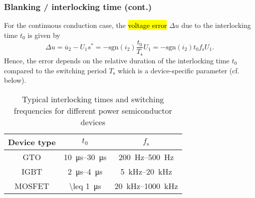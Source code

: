 \begin{frame}
    \frametitle{Blanking / interlocking time (cont.)} 
        For the continuous conduction case, the \hl{voltage error} $\Delta u$ due to the interlocking time $t_0$ is given by
        \begin{equation}
            \Delta u =\overline{u}_2 - U_1s^* = -\mathrm{sgn}(i_2)\frac{t_0}{T_\mathrm{s}}  U_1= -\mathrm{sgn}(i_2)t_0 f_\mathrm{s} U_1.
        \end{equation}
        Hence, the error depends on the relative duration of the interlocking time $t_0$ compared to the switching period $T_\mathrm{s}$ which is a device-specific parameter (cf. below). 

        \begin{table}
            \begin{tabular}{c c c}
                \toprule
                Device type & $t_0$ & $f_\mathrm{s}$ \\
                \midrule
                GTO & \SIrange{10}{30}{\micro\second} & \SIrange{200}{500}{\hertz} \\
                IGBT & \SIrange{2}{4}{\micro\second} & \SIrange{5}{20}{\kilo\hertz} \\
                MOSFET & \SI{\leq 1}{\micro\second} & \SIrange{20}{1000}{\kilo\hertz} \\
                \bottomrule
            \end{tabular}
            \caption{Typical interlocking times and switching frequencies for different power semiconductor devices}
            \label{tab:interlocking_times}
        \end{table}
\end{frame}

